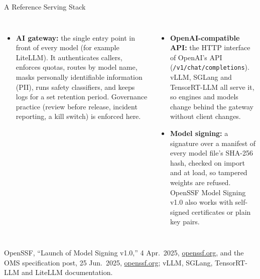\begin{frame}{A Reference Serving Stack}
  \vspace{0.2em}
  \begin{columns}[T,onlytextwidth]
      \begin{itemize}\scriptsize\itemsep0.15em
        \item[\textcolor{red}{$\blacktriangleright$}] \textbf{AI gateway:} the single entry point in front of every model (for example LiteLLM). It authenticates callers, enforces quotas, routes by model name, masks personally identifiable information (PII), runs safety classifiers, and keeps logs for a set retention period. Governance practice (review before release, incident reporting, a kill switch) is enforced here.
      \end{itemize}
      \begin{itemize}\scriptsize\itemsep0.15em
        \item[\textcolor{red}{$\blacktriangleright$}] \textbf{OpenAI-compatible API:} the HTTP interface of OpenAI's API (\texttt{/v1/chat/completions}). vLLM, SGLang and TensorRT-LLM all serve it, so engines and models change behind the gateway without client changes.
        \item[\textcolor{red}{$\blacktriangleright$}] \textbf{Model signing:} a signature over a manifest of every model file's SHA-256 hash, checked on import and at load, so tampered weights are refused. OpenSSF Model Signing v1.0 also works with self-signed certificates or plain key pairs.
      \end{itemize}
  \end{columns}
  \vspace{0.1em}
  {\scriptsize OpenSSF, ``Launch of Model Signing v1.0,'' 4 Apr.\ 2025, \href{https://openssf.org/blog/2025/04/04/launch-of-model-signing-v1-0-openssf-ai-ml-working-group-secures-the-machine-learning-supply-chain/}{openssf.org}, and the OMS specification post, 25 Jun.\ 2025, \href{https://openssf.org/blog/2025/06/25/an-introduction-to-the-openssf-model-signing-oms-specification/}{openssf.org}; vLLM, SGLang, TensorRT-LLM and LiteLLM documentation.\par}
\end{frame}

